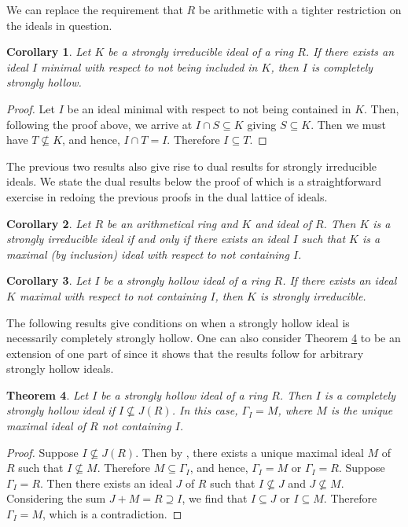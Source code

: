 \documentclass[11pt,english]{amsart}
\newtheorem{theorem}{Theorem}[section]
\newtheorem{corollary}[theorem]{Corollary}
\theoremstyle{definition}
\numberwithin{equation}{section}
\theoremstyle{remark}
\begin{document}
We can replace the requirement that $R$ be arithmetic with a tighter restriction on the ideals in question.	

\begin{corollary}
    Let $K$ be a strongly irreducible ideal of a ring $R$. If there exists an ideal $I$ minimal with respect to not being included in $K$, then $I$ is completely strongly hollow.
\end{corollary}

\begin{proof}
 Let $I$ be an ideal minimal with respect to not being contained in $K$. Then, following the proof above, we arrive at $I\cap S\subseteq K$ giving $S\subseteq K$. Then we must have $T\not\subseteq K$, and hence, $I\cap T=I$. Therefore $I\subseteq T$.
\end{proof}
The previous two results also give rise to dual results for strongly irreducible ideals. We state the dual results below the proof of which is a straightforward exercise in redoing the previous proofs in the dual lattice of ideals. 
\begin{corollary}
    Let $R$ be an arithmetical ring and $K$ and ideal of $R$. Then $K$ is a strongly irreducible ideal if and only if there exists an ideal $I$ such that $K$ is a maximal (by inclusion) ideal with respect to not containing  $I$.
\end{corollary} 
\begin{corollary}
      Let $I$ be a strongly hollow ideal of a ring $R$. If there exists an ideal $K$ maximal with respect to not containing $I$, then $K$ is strongly irreducible.
\end{corollary}

The following results give conditions on when a strongly hollow ideal is necessarily completely strongly hollow. One can also consider Theorem \ref{escapes_jacobian} to be an extension of one part of \cite[Theorem.~1.27]{Rostami2021} since it shows that the results follow for arbitrary strongly hollow ideals.

\begin{theorem}\label{escapes_jacobian}
    Let $I$ be a strongly hollow ideal of a ring $R$. Then $I$ is a completely strongly hollow ideal if $I\not\subseteq J(R)$. In this case, $\Gamma_I=M$, where $M$ is the unique maximal ideal of $R$ not containing $I$.
\end{theorem}
\begin{proof}
    Suppose $I\not\subseteq J(R)$. Then by \cite[Proposition.~3.8]{Ceken-Yuksel}, there exists a unique maximal ideal $M$ of $R$ such that $I\not\subseteq M$. Therefore $M\subseteq\Gamma_I$, and hence, $\Gamma_I=M$ or $\Gamma_I=R$. Suppose $\Gamma_I=R$. Then there exists an ideal $J$ of $R$ such that $I\not\subseteq J$ and $J\not\subseteq M$. Considering the sum $J+M=R\supseteq I$, we find that $I\subseteq J$ or $I\subseteq M$. Therefore $\Gamma_I=M$, which is a contradiction. 
\end{proof}
\end{document}
